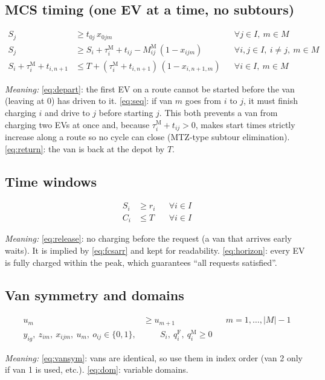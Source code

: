 \documentclass[12pt,a4paper]{article}
\newcommand{\mdesc}[1]{\par{\textit{Meaning:} #1}\par}
\begin{document}
\subsection{MCS timing (one EV at a time, no subtours)}
\begin{align}
S_j &\ge t_{0j}\,x_{0jm} && \forall j\in I,\ m\in M \label{eq:depart}\\
S_j &\ge S_i+\tau^{\mathrm M}_i+t_{ij}-M^{\mathrm M}_{ij}\,(1-x_{ijm}) && \forall i,j\in I,\ i\ne j,\ m\in M \label{eq:seq}\\
S_i+\tau^{\mathrm M}_i+t_{i,n+1} &\le T+(\tau^{\mathrm M}_i+t_{i,n+1})\,(1-x_{i,n+1,m}) && \forall i\in I,\ m\in M \label{eq:return}
\end{align}
\mdesc{\eqref{eq:depart}: the first EV on a route cannot be started before the van (leaving at 0) has driven to it. \eqref{eq:seq}: if van $m$ goes from $i$ to $j$, it must finish charging $i$ and drive to $j$ before starting $j$. This both prevents a van from charging two EVs at once and, because $\tau^{\mathrm M}_i+t_{ij}>0$, makes start times strictly increase along a route so no cycle can close (MTZ-type subtour elimination). \eqref{eq:return}: the van is back at the depot by $T$.}

\subsection{Time windows}
\begin{align}
S_i &\ge r_i && \forall i\in I \label{eq:release}\\
C_i &\le T && \forall i\in I \label{eq:horizon}
\end{align}
\mdesc{\eqref{eq:release}: no charging before the request (a van that arrives early waits). It is implied by \eqref{eq:fcsarr} and kept for readability. \eqref{eq:horizon}: every EV is fully charged within the peak, which guarantees ``all requests satisfied''.}

\subsection{Van symmetry and domains}
\begin{align}
u_m &\ge u_{m+1} && m=1,\dots,|M|-1 \label{eq:vansym}\\
y_{ig},\ z_{im},\ x_{ijm},\ u_m,\ o_{ij}\in\{0,1\}, & \qquad S_i,\ q^{\mathrm F}_i,\ q^{\mathrm M}_i\ge0 \label{eq:dom}
\end{align}
\mdesc{\eqref{eq:vansym}: vans are identical, so use them in index order (van 2 only if van 1 is used, etc.). \eqref{eq:dom}: variable domains.}
\end{document}
